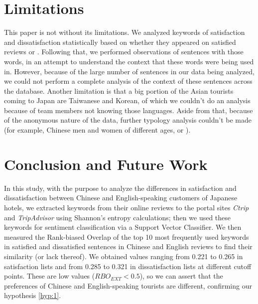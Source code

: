 \section{Limitations}\label{limitations}

This paper is not without its limitations. We analyzed keywords of satisfaction and dissatisfaction statistically based on whether they appeared on satisfied reviews or \DIFdelbegin {}\DIFdelend \DIFaddbegin {}\DIFaddend . Following that, we performed observations of sentences with those words, in an attempt to understand the context that these words were being used in. However, because of the large number of sentences in our data being analyzed, we could not perform a complete analysis of the context of these sentences across the database. Another limitation is that a big portion of the Asian tourists coming to Japan are Taiwanese and Korean, of which we couldn't do an analysis because of team members not knowing those languages. Aside from that, because of the anonymous nature of the data, further typology analysis couldn't be made (for example, Chinese men and women of different ages, or \DIFdelbegin {}\DIFdelend \DIFaddbegin {}\DIFaddend ).

\section{Conclusion and Future Work}\label{conclusion}

In this study, with the purpose to analyze the differences in satisfaction and dissatisfaction between Chinese and English-speaking customers of Japanese hotels, we extracted keywords from their online reviews \DIFaddbegin {}\DIFaddend to the portal sites \textit{Ctrip} and \textit{TripAdvisor} using Shannon's entropy calculations; then we used these keywords for sentiment classification via a Support Vector Classifier. We then measured the Rank-biased Overlap of the top 10 most frequently used keywords in satisfied and dissatisfied sentences in Chinese and English reviews to find their similarity (or lack thereof). We obtained values ranging from 0.221 to 0.265 in satisfaction lists and from 0.285 to 0.321 in dissatisfaction lists at different cutoff points. These are low values (\(RBO_{EXT} < 0.5\)), so we can assert that the preferences of Chinese and English-speaking tourists are different, confirming our hypothesis \ref{hyp:1}. 


